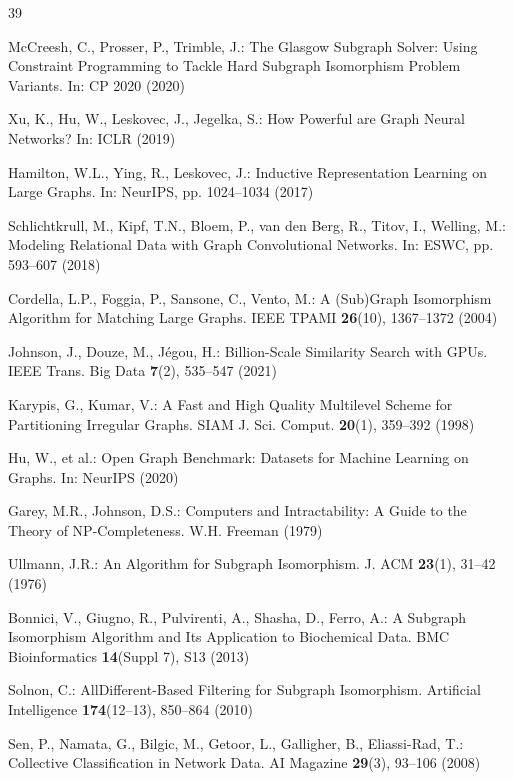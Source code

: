 \documentclass[runningheads]{llncs}
\begin{document}
\begin{thebibliography}{39}

McCreesh, C., Prosser, P., Trimble, J.: The Glasgow Subgraph Solver: Using Constraint Programming to Tackle Hard Subgraph Isomorphism Problem Variants. In: CP 2020 (2020)

Xu, K., Hu, W., Leskovec, J., Jegelka, S.: How Powerful are Graph Neural Networks? In: ICLR (2019)

Hamilton, W.L., Ying, R., Leskovec, J.: Inductive Representation Learning on Large Graphs. In: NeurIPS, pp. 1024--1034 (2017)

Schlichtkrull, M., Kipf, T.N., Bloem, P., van den Berg, R., Titov, I., Welling, M.: Modeling Relational Data with Graph Convolutional Networks. In: ESWC, pp. 593--607 (2018)

Cordella, L.P., Foggia, P., Sansone, C., Vento, M.: A (Sub)Graph Isomorphism Algorithm for Matching Large Graphs. IEEE TPAMI \textbf{26}(10), 1367--1372 (2004)

Johnson, J., Douze, M., J\'egou, H.: Billion-Scale Similarity Search with GPUs. IEEE Trans. Big Data \textbf{7}(2), 535--547 (2021)

Karypis, G., Kumar, V.: A Fast and High Quality Multilevel Scheme for Partitioning Irregular Graphs. SIAM J. Sci. Comput. \textbf{20}(1), 359--392 (1998)

Hu, W., et al.: Open Graph Benchmark: Datasets for Machine Learning on Graphs. In: NeurIPS (2020)

Garey, M.R., Johnson, D.S.: Computers and Intractability: A Guide to the Theory of NP-Completeness. W.H. Freeman (1979)

Ullmann, J.R.: An Algorithm for Subgraph Isomorphism. J. ACM \textbf{23}(1), 31--42 (1976)

Bonnici, V., Giugno, R., Pulvirenti, A., Shasha, D., Ferro, A.: A Subgraph Isomorphism Algorithm and Its Application to Biochemical Data. BMC Bioinformatics \textbf{14}(Suppl 7), S13 (2013)

Solnon, C.: AllDifferent-Based Filtering for Subgraph Isomorphism. Artificial Intelligence \textbf{174}(12--13), 850--864 (2010)

Sen, P., Namata, G., Bilgic, M., Getoor, L., Galligher, B., Eliassi-Rad, T.: Collective Classification in Network Data. AI Magazine \textbf{29}(3), 93--106 (2008)


\end{thebibliography}
\end{document}
